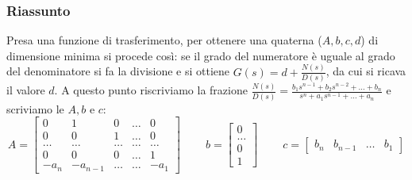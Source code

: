 \subsubsection{Riassunto}
Presa una funzione di trasferimento, per ottenere una quaterna ($A,b,c,d$) di dimensione minima si procede così: se il grado del numeratore è uguale al grado del denominatore si fa la divisione e si ottiene $G(s) = d + \frac{N(s)}{D(s)}$, da cui si ricava il valore $d$. A questo punto riscriviamo la frazione $\frac{N(s)}{D(s)} = \frac{ b_1 s^{n-1} + b_2 s^{n-2} + \dots + b_n }{ s^n + a_1 s^{n-1} + \dots + a_n }$ e scriviamo le $A, b$ e $c$:
\[
    A=\left[\begin{matrix}
        0 & 1 & 0 & \dots & 0 \\
        0 & 0 & 1 & \dots & 0 \\
        \dots & \dots &\dots&\dots&\dots\\
        0 & 0 & 0 & \dots & 1\\
        -a_n & -a_{n-1} & \dots & \dots & -a_1
    \end{matrix}\right] \;\;\;\;\;\;\;\; b=\left[\begin{matrix}
        0\\\dots\\0\\1
    \end{matrix}\right] \;\;\;\;\;\;\;\; c=\left[\begin{matrix}
        b_n & b_{n-1} & \dots & b_1
    \end{matrix}\right]
\]